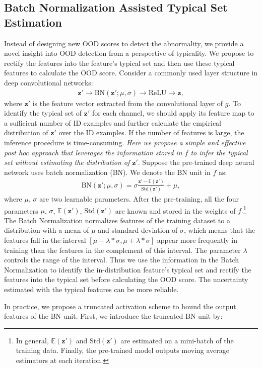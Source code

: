 \documentclass{article}
\newcommand{\benr}{\begin{eqnarray}}
\newcommand{\eenr}{\end{eqnarray}}
\def\rvz{{\mathbf{z}}}
\newcommand{\E}{\mathbb{E}}
\newcommand{\rarrow}{\rightarrow}
\begin{document}
\subsection{Batch Normalization Assisted Typical Set Estimation} \label{BATS}
Instead of designing new OOD scores to detect the abnormality, we provide a novel insight into OOD detection from a perspective of typicality. We propose to rectify the features into the feature's typical set and then use these typical features to calculate the OOD score.
Consider a {commonly} used layer structure in deep convolutional networks:
\benr\label{layer}
\rvz' \rarrow \text{BN}(\rvz'; \mu, \sigma) \rarrow \text{ReLU}  \rarrow \rvz,
\eenr
where $\rvz'$ is the feature vector extracted from the convolutional layer of $g.$
To identify the typical set of $\rvz'$ for each channel, we should apply its feature map to a sufficient number of ID examples and further calculate the empirical distribution of $\rvz'$ over the ID examples. 
If the number of features is large, the inference procedure is time-consuming.
{\it Here we propose a simple and effective post hoc approach that leverages the information stored in $f$ to infer the typical set without estimating the distribution of $\rvz'.$}
Suppose the pre-trained deep neural network uses batch normalization (BN). We denote the BN unit in $f$ as:
\benr
\text{BN}(\rvz'; \mu, \sigma) = \sigma \frac{\rvz' - \E(\rvz')}{\text{Std}(\rvz')} + \mu,
\eenr
where  $\mu$, $\sigma$ are two learnable parameters.   
After the pre-training, all the four parameters $\mu$, $\sigma$, $\E(\rvz')$, $\text{Std}(\rvz')$ are known and stored in the weights of $f.$\footnote{In general, $\E(\rvz')$ and $\text{Std}(\rvz')$ are estimated on a mini-batch of the training data. Finally, the pre-trained model outputs moving average estimators at each iteration.}
The Batch Normalization normalizes features of the training dataset to a distribution with a mean of $\mu$ and standard deviation of $\sigma$, which means that the features fall in the interval $[\mu-\lambda*\sigma, \mu+\lambda*\sigma]$ appear more frequently in training than the features in the complement of this interval. {The parameter $\lambda$ controls the range of the interval.} Thus we use the information in the Batch Normalization to identify the in-distribution feature's typical set and rectify the features into the typical set before calculating the OOD score. The uncertainty estimated with the typical features can be more reliable.

In practice, we propose a truncated activation scheme to bound the output features of the BN unit.
First, we introduce the truncated BN unit by:
\end{document}
